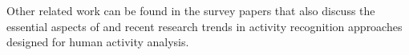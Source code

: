 Other related work can be found in the survey
papers
that also discuss the essential aspects of and recent research trends in
activity recognition approaches designed for human activity analysis.

%

%

%

